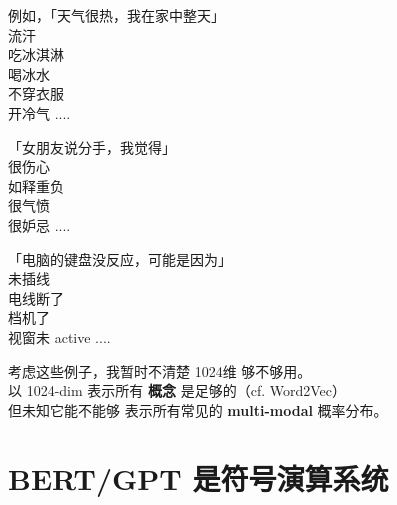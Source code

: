 例如，「天气很热，我在家中整天\underline{\hspace*{2cm}}」\\
	\tab \textbullet 流汗 \\
	\tab \textbullet 吃冰淇淋 \\
	\tab \textbullet 喝冰水 \\
	\tab \textbullet 不穿衣服 \\
	\tab \textbullet 开冷气 ....

「女朋友说分手，我觉得\underline{\hspace*{2cm}}」\\
\tab \textbullet 很伤心 \\
\tab \textbullet 如释重负 \\
\tab \textbullet 很气愤 \\
\tab \textbullet 很妒忌 ....

「电脑的键盘没反应，可能是因为\underline{\hspace*{2cm}}」\\
\tab \textbullet 未插线 \\
\tab \textbullet 电线断了 \\
\tab \textbullet 档机了 \\
\tab \textbullet 视窗未 active ....

考虑这些例子，我暂时不清楚 1024维 够不够用。 \\
以 1024-dim 表示所有 \textbf{概念} 是足够的（cf. Word2Vec） \\
但未知它能不能够 表示所有常见的 \textbf{multi-modal} 概率分布。

\section{BERT/GPT 是符号演算系统}

